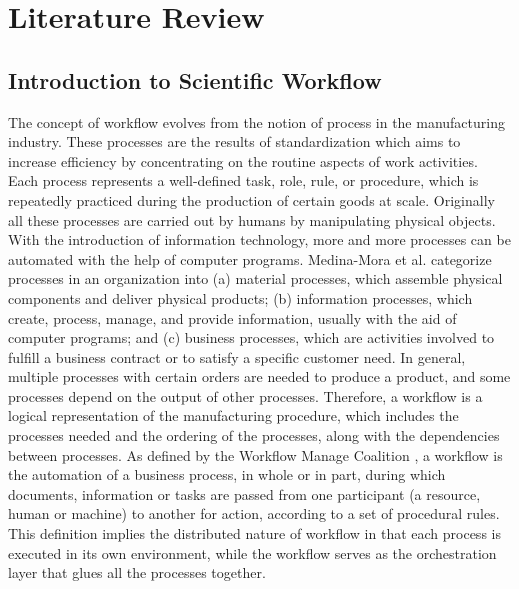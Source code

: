 \chapter{Literature Review}
\label{chapter:literature}

\section{Introduction to Scientific Workflow}
\label{sec:intro_sci_workflow}


The concept of workflow evolves from the notion of process in the manufacturing industry. These processes are the results of standardization which aims to increase efficiency by concentrating on the routine aspects of work activities. Each process represents a well-defined task, role, rule, or procedure, which is repeatedly practiced during the production of certain goods at scale. Originally all these processes are carried out by humans by manipulating physical objects. With the introduction of information technology, more and more processes can be automated with the help of computer programs. Medina-Mora et al. \cite{medina1992action} categorize processes in an organization into (a) material processes, which assemble physical components and deliver physical products; (b) information processes, which create, process, manage, and provide information, usually with the aid of computer programs; and (c) business processes, which are activities involved to fulfill a business contract or to satisfy a specific customer need. In general, multiple processes with certain orders are needed to produce a product, and some processes depend on the output of other processes. Therefore, a workflow is a logical representation of the manufacturing procedure, which includes the processes needed and the ordering of the processes, along with the dependencies between processes. As defined by the Workflow Manage Coalition \cite{hollingsworth1995workflow}, a workflow is the automation of a business process, in whole or in part, during which documents, information or tasks are passed from one participant (a resource, human or machine) to another for action, according to a set of procedural rules. This definition implies the distributed nature of workflow in that each process is executed in its own environment, while the workflow serves as the orchestration layer that glues all the processes together. 

